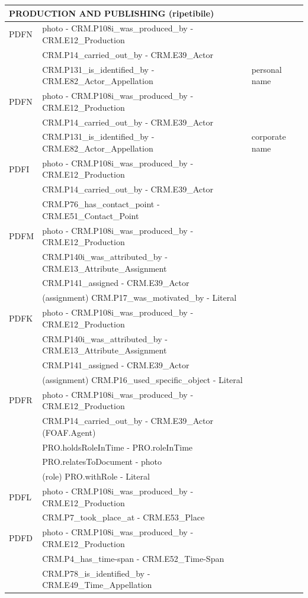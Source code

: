 \begin{center}
\begin{longtable}{ | p{1cm} | p{8cm} | p{3cm} | }
  \multicolumn{3}{|l|}{\cellcolor{lightcyan}PRODUCTION AND PUBLISHING (ripetibile)}\\ \hline
  PDFN &  photo - CRM.P108i\_was\_produced\_by - CRM.E12\_Production & \\
   & CRM.P14\_carried\_out\_by - CRM.E39\_Actor & \\
   & CRM.P131\_is\_identified\_by - CRM.E82\_Actor\_Appellation & personal name \\ \hline
  PDFN &  photo - CRM.P108i\_was\_produced\_by - CRM.E12\_Production & \\
   & CRM.P14\_carried\_out\_by - CRM.E39\_Actor & \\
   & CRM.P131\_is\_identified\_by - CRM.E82\_Actor\_Appellation & corporate name \\ \hline
  PDFI &  photo - CRM.P108i\_was\_produced\_by - CRM.E12\_Production & \\
   & CRM.P14\_carried\_out\_by - CRM.E39\_Actor & \\
   & CRM.P76\_has\_contact\_point - CRM.E51\_Contact\_Point & \\ \hline
  PDFM &  photo - CRM.P108i\_was\_produced\_by - CRM.E12\_Production & \\
   & CRM.P140i\_was\_attributed\_by - CRM.E13\_Attribute\_Assignment & \\
   & CRM.P141\_assigned - CRM.E39\_Actor & \\
   & (assignment) CRM.P17\_was\_motivated\_by - Literal & \\ \hline
  PDFK &  photo - CRM.P108i\_was\_produced\_by - CRM.E12\_Production & \\
   & CRM.P140i\_was\_attributed\_by - CRM.E13\_Attribute\_Assignment & \\
   & CRM.P141\_assigned - CRM.E39\_Actor & \\ 
   & (assignment) CRM.P16\_used\_specific\_object - Literal & \\ \hline
  PDFR &  photo - CRM.P108i\_was\_produced\_by - CRM.E12\_Production & \\
   & CRM.P14\_carried\_out\_by - CRM.E39\_Actor (FOAF.Agent) & \\
   & PRO.holdsRoleInTime - PRO.roleInTime & \\
   & PRO.relatesToDocument - photo & \\
   & (role) PRO.withRole - Literal & \\ \hline
  PDFL &  photo - CRM.P108i\_was\_produced\_by - CRM.E12\_Production & \\
   & CRM.P7\_took\_place\_at - CRM.E53\_Place & \\ \hline
  PDFD &  photo - CRM.P108i\_was\_produced\_by - CRM.E12\_Production & \\
   & CRM.P4\_has\_time-span - CRM.E52\_Time-Span & \\ 
   & CRM.P78\_is\_identified\_by - CRM.E49\_Time\_Appellation & \\ \hline
  

\end{longtable}
\end{center}
